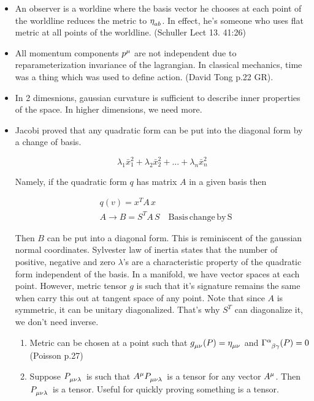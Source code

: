 \documentclass{report}
\begin{document}
\begin{itemize}
  \item An observer is a worldine where the basis vector he chooses at each point of the worldline reduces the metric to $\eta\indices{_a_b}$. In effect, he's someone who uses flat metric at all points of the worldline. (Schuller Lect 13. 41:26)

  \item All momentum components $p\indices{^\mu}$ are not independent due to reparameterization invariance of the lagrangian. In classical mechanics, time was a thing which was used to define action. (David Tong p.22 GR).


  \item In 2 dimesnions, gaussian curvature is sufficient to describe inner properties of the space. In higher dimensions, we need more.

  \item Jacobi proved that any quadratic form can be put into the diagonal form by a change of basis.

    $$\lambda_1\bar{x}_1^2 + \lambda_2\bar{x}_2^2+...+\lambda_n\bar{x}_n^2$$

    Namely, if the quadratic form $q$ has matrix $A$ in a given basis then

    \begin{align}
      &q(v) = x^T A \,x\\
      &A\rightarrow B = S^T A \,S \quad \mathrm{Basis\, change\, by\, S}
    \end{align}

    Then $B$ can be put into a diagonal form. This is reminiscent of the gaussian normal coordinates. Sylvester law of inertia states that the number of positive, negative and zero $\lambda$'s are a characteristic property of the quadratic form independent of the basis. In a manifold, we have vector spaces at each point. However, metric tensor $g$ is such that it's signature remains the same when carry this out at tangent space of any point. Note that since $A$ is symmetric, it can be unitary diagonalized. That's why $S^T$ can diagonalize it, we don't need inverse.

    \begin{enumerate}
      \item Metric can be chosen at a point such that $g\indices{_\mu_\nu}(P) = \eta\indices{_\mu_\nu}$ and $\Gamma\indices{^\alpha_\beta_\gamma}(P) = 0$ (Poisson p.27)

      \item Suppose $P\indices{_\mu_\nu_\lambda}$ is such that $A\indices{^\mu}P\indices{_\mu_\nu_\lambda}$ is a tensor for any vector $A\indices{^\mu}$. Then $P\indices{_\mu_\nu_\lambda}$ is a tensor. Useful for quickly proving something is a tensor.
      

\end{enumerate}
\end{itemize}
\end{document}

